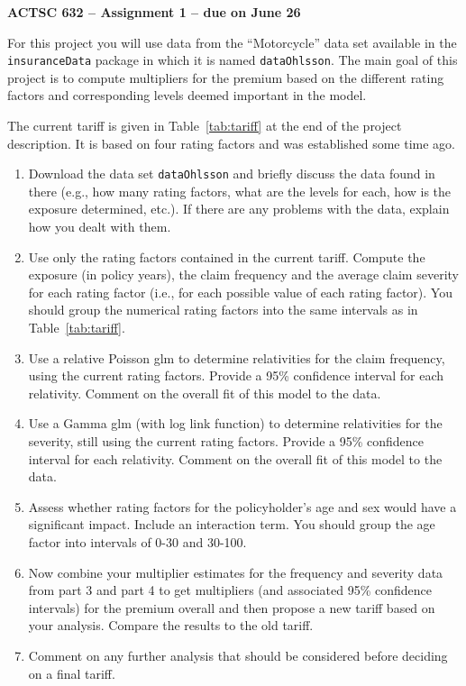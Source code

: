 \documentclass[11pt]{article}
\begin{document}
\begin{center}
{\large \bf ACTSC 632 -- Assignment 1 -- due on June 26} \\

\end{center}

For this project you will use data from the ``Motorcycle'' data set available in the {\tt insuranceData} package in which it is named {\tt dataOhlsson}.  The main goal of this project is to compute multipliers for the premium based on the different rating factors and corresponding levels deemed important in the model.

The current tariff is given in Table~\ref{tab:tariff} at the end of the project description. It is based on four rating factors and was established some time ago. 


\begin{enumerate}
    \item   Download the data set {\tt dataOhlsson} and briefly discuss the data found in there (e.g., how many rating factors, what are the levels for each, how is the exposure determined, etc.). If there are any problems with the data, explain how you dealt with them.
    \item   Use only the rating factors contained in the current tariff. Compute the exposure (in policy years), the claim frequency and the average claim severity for each rating factor (i.e., for each possible value of each rating factor).
    You should group the numerical rating factors into the same intervals as in Table~\ref{tab:tariff}.
    \item   Use a relative Poisson glm to determine relativities for the claim frequency, using the current rating factors.
    Provide a 95\% confidence interval for each relativity. Comment on the overall fit of this model to the data.
    \item   Use a Gamma glm (with log link function) to determine relativities for the severity, still using the current rating factors.
    Provide a 95\% confidence interval for each relativity. Comment on the overall fit of this model to the data.
    \item   Assess whether rating factors for the policyholder's age and sex would have a significant impact. Include an interaction term. You should group the age factor into intervals of 0-30 and 30-100. 
    \item   Now combine your multiplier estimates for the frequency and severity data from part 3 and part 4 to get multipliers (and associated 95\% confidence intervals) for the premium overall and then propose a new tariff based on your analysis. Compare the results to the old tariff.
    \item   Comment on any further analysis that should be considered before deciding on a final tariff. 
\end{enumerate}
\end{document}
